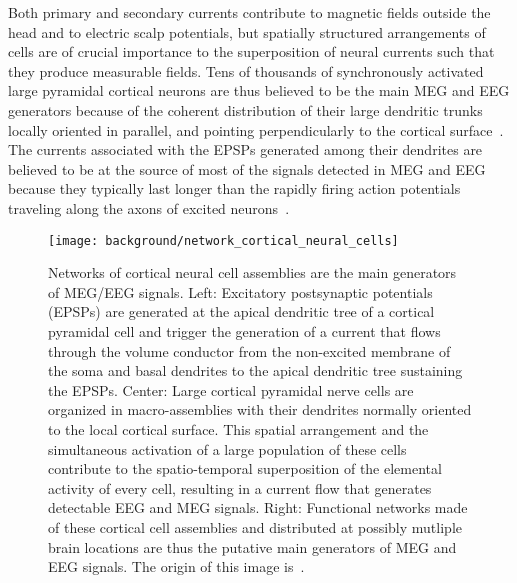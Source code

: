 Both primary and secondary currents contribute to magnetic fields outside the head and to electric scalp potentials, but spatially structured arrangements of cells are of crucial importance to the superposition of neural currents such that they produce measurable fields. Tens of thousands of synchronously activated large pyramidal cortical neurons are thus believed to be the main MEG and EEG generators because of the coherent distribution of their large dendritic trunks locally oriented in parallel, and pointing perpendicularly to the cortical surface~\cite{nunez2000relationship}. The currents associated with the EPSPs generated among their dendrites are believed to be at the source of most of the signals detected in MEG and EEG because they typically last longer than the rapidly firing action potentials traveling along the axons of excited neurons~\cite{nunez2006electric}. %

\begin{figure}
	\centering
	\texttt{[image: background/network\_cortical\_neural\_cells]}
    \caption{Networks of cortical neural cell assemblies are the main generators of MEG/EEG signals. Left: Excitatory postsynaptic potentials (EPSPs) are generated at the apical dendritic tree of a cortical pyramidal cell and trigger the generation of a current that flows through the volume conductor from the non-excited membrane of the soma and basal dendrites to the apical dendritic tree sustaining the EPSPs. Center:  Large cortical pyramidal nerve cells are organized in macro-assemblies with their dendrites normally oriented to the local cortical surface. This spatial arrangement
and the simultaneous activation of a large population of these cells contribute to the spatio-temporal superposition of the elemental activity of every cell, resulting in a current flow that generates detectable EEG and MEG signals. Right: Functional networks made of these cortical cell assemblies and distributed at possibly mutliple brain locations are thus the putative main generators of MEG and EEG signals. The origin of this image is~\cite{baillet2001electromagnetic}.
    }
    \label{fig:network_cortical_neural_cells}
\end{figure}

